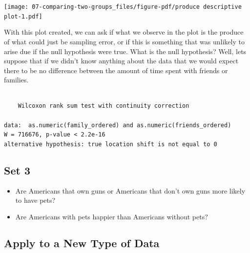 \documentclass[
  letterpaper,
  DIV=11,
  numbers=noendperiod]{scrreprt}
\newenvironment{Shaded}{\begin{snugshade}}{\end{snugshade}}
\newcommand{\AttributeTok}[1]{\textcolor[rgb]{0.40,0.45,0.13}{#1}}
\newcommand{\ConstantTok}[1]{\textcolor[rgb]{0.56,0.35,0.01}{#1}}
\newcommand{\DocumentationTok}[1]{\textcolor[rgb]{0.37,0.37,0.37}{\textit{#1}}}
\newcommand{\FunctionTok}[1]{\textcolor[rgb]{0.28,0.35,0.67}{#1}}
\newcommand{\NormalTok}[1]{\textcolor[rgb]{0.00,0.23,0.31}{#1}}
\newcommand{\SpecialCharTok}[1]{\textcolor[rgb]{0.37,0.37,0.37}{#1}}
\providecommand{\tightlist}{%
  \setlength{\itemsep}{0pt}\setlength{\parskip}{0pt}}\usepackage{longtable,booktabs,array}
\begin{document}
\texttt{[image: 07-comparing-two-groups\_files/figure-pdf/produce descriptive plot-1.pdf]}

With this plot created, we can ask if what we observe in the plot is the
produce of what could just be sampling error, or if this is something
that was unlikely to arise due if the null hypothesis were true. What is
the null hypothesis? Well, lets suppose that if we didn't know anything
about the data that we would expect there to be no difference between
the amount of time spent with friends or families.

\begin{Shaded}
\end{Shaded}

\begin{verbatim}

    Wilcoxon rank sum test with continuity correction

data:  as.numeric(family_ordered) and as.numeric(friends_ordered)
W = 716676, p-value < 2.2e-16
alternative hypothesis: true location shift is not equal to 0
\end{verbatim}

\subsection{Set 3}\label{set-3}

\begin{itemize}
\tightlist
\item
  Are Americans that own guns or Americans that don't own guns more
  likely to have pets?
\item
  Are Americans with pets happier than Americans without pets?
\end{itemize}

\subsection{Apply to a New Type of
Data}\label{apply-to-a-new-type-of-data}
\end{document}
